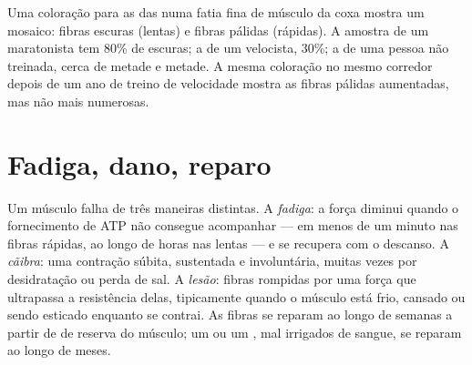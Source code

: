 \begin{example}\label{ex:g10:muscles-and-joints:biopsy}
Uma coloração para as  das  numa fatia fina de
músculo da coxa mostra um mosaico: fibras escuras (lentas) e fibras
pálidas (rápidas). A amostra de um maratonista tem 80\% de escuras; a
de um velocista, 30\%; a de uma pessoa não treinada, cerca de metade e
metade. A mesma coloração no mesmo corredor depois de um ano de treino
de velocidade mostra as fibras pálidas aumentadas, mas não mais
numerosas.
\end{example}

\section{Fadiga, dano, reparo}

\begin{proposition}\label{prop:g10:muscles-and-joints:limits}
Um músculo falha de três maneiras distintas. A \emph{fadiga}: a força
diminui quando o fornecimento de ATP não consegue acompanhar --- em
menos de um minuto nas fibras rápidas, ao longo de horas nas lentas ---
e se recupera com o descanso. A \emph{cãibra}: uma contração súbita,
sustentada e involuntária, muitas vezes por desidratação ou perda de
sal. A \emph{lesão}: fibras rompidas por uma força que ultrapassa a
resistência delas, tipicamente quando o músculo está frio, cansado ou
sendo esticado enquanto se contrai. As fibras se reparam ao longo de
semanas a partir de  de reserva do músculo; um  ou um
, mal irrigados de sangue, se reparam ao longo de meses.
\end{proposition}
\admitted

